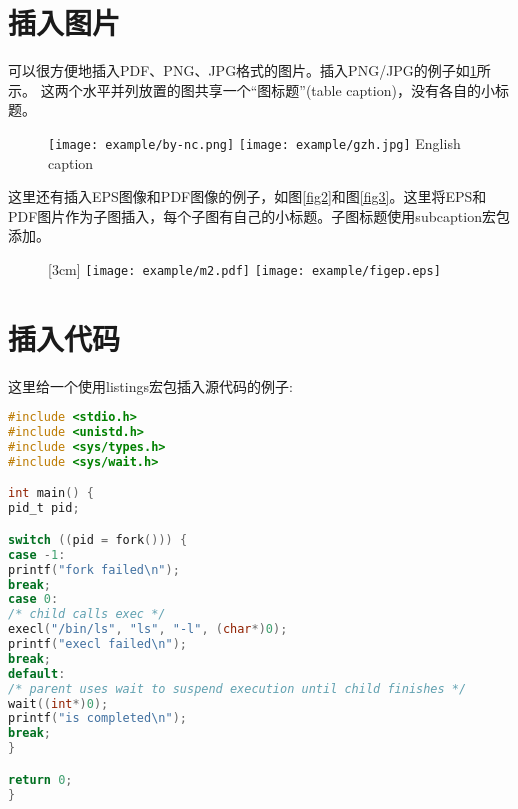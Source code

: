 \section{插入图片}

\XeTeX 可以很方便地插入PDF、PNG、JPG格式的图片。插入PNG/JPG的例子如\ref{fig1}所示。
这两个水平并列放置的图共享一个“图标题”(table caption)，没有各自的小标题。

\begin{figure}[!htp]
\centering
\texttt{[image: example/by-nc.png]}
\hspace{1cm}
\texttt{[image: example/gzh.jpg]}
{English caption}
\label{fig1}
\end{figure}

这里还有插入EPS图像和PDF图像的例子，如图\ref{fig2}和图\ref{fig3}。这里将EPS和PDF图片作为子图插入，每个子图有自己的小标题。子图标题使用subcaption宏包添加。

\begin{figure}[!htp]
\centering
{}[3cm] %
{\texttt{[image: example/m2.pdf]}}
\hspace{4em}
{	\texttt{[image: example/figep.eps]}}
\label{fig4}
\end{figure}




\section{插入代码}

这里给一个使用listings宏包插入源代码的例子:
\begin{lstlisting}[language={C}, caption={一段C源代码}]
#include <stdio.h>
#include <unistd.h>
#include <sys/types.h>
#include <sys/wait.h>

int main() {
pid_t pid;

switch ((pid = fork())) {
case -1:
printf("fork failed\n");
break;
case 0:
/* child calls exec */
execl("/bin/ls", "ls", "-l", (char*)0);
printf("execl failed\n");
break;
default:
/* parent uses wait to suspend execution until child finishes */
wait((int*)0);
printf("is completed\n");
break;
}

return 0;
}
\end{lstlisting}


